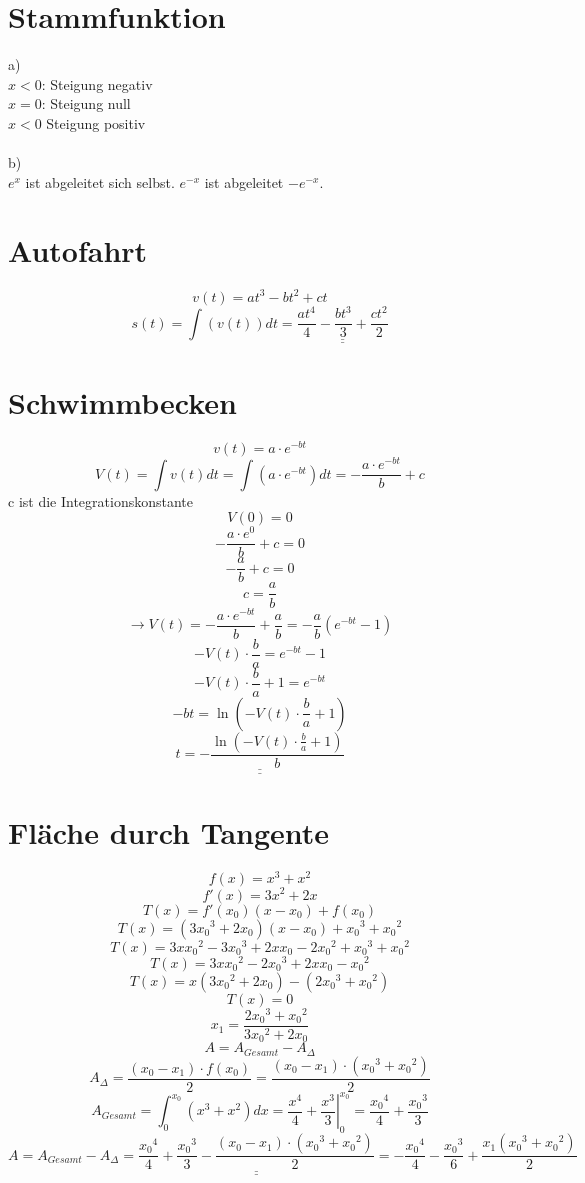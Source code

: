 \section{Stammfunktion}
a)\\
$x<0$: Steigung negativ\\
$x=0$: Steigung null\\
$x<0$ Steigung positiv\\\\
b)\\
$e^x$ ist abgeleitet sich selbst. $e^{-x}$ ist abgeleitet $-e^{-x}$. 

\section{Autofahrt}
\[ v(t) = a t^3 - b t^2 + c t \]
\[ s(t) = \int (v(t)) dt = \underline{\underline{\frac{a t^4}{4} - \frac{b t^3}{3} + \frac{c t^2}{2}}} \]

\section{Schwimmbecken}
\[ v(t) = a \cdot e^{-bt} \]
\[ V(t) = \int v(t) dt = \int \left(a \cdot e^{-bt}\right) dt = -\frac{a \cdot e^{-bt}}{b} + c \]
c ist die Integrationskonstante
\[ V(0) = 0 \]
\[ -\frac{a \cdot e^{0}}{b} + c = 0 \]
\[ -\frac{a}{b} + c = 0 \]
\[ c = \frac{a}{b} \]
\[ \rightarrow V(t) = -\frac{a \cdot e^{-bt}}{b} + \frac{a}{b} = -\frac{a}{b} \left( e^{-bt} - 1 \right) \]
\[ -V(t) \cdot \frac{b}{a} = e^{-bt} - 1 \]
\[ -V(t) \cdot \frac{b}{a} + 1 = e^{-bt} \]
\[ -bt = \ln\left(-V(t) \cdot \frac{b}{a} + 1\right) \]
\[ \underline{\underline{t = -\frac{\ln\left(-V(t) \cdot \frac{b}{a} + 1\right)}{b}}} \]

\section{Fläche durch Tangente}
\[ f(x) = x^3 + x^2 \]
\[ f'(x) = 3 x^2 + 2 x \]
\[ T(x) = f'(x_0)(x - x_0) + f(x_0) \]
\[ T(x) = (3 {x_0}^3 + 2 x_0)(x-x_0) + {x_0}^3 + {x_0}^2 \]
\[ T(x) = 3 x {x_0}^2 - 3 {x_0}^3 + 2 x x_0 - 2 {x_0}^2 + {x_0}^3 + {x_0}^2 \]
\[ T(x) = 3 x {x_0}^2 - 2 {x_0}^3 + 2 x x_0 - {x_0}^2 \]
\[ T(x) = x(3 {x_0}^2 + 2 x_0) - (2 {x_0}^3 + {x_0}^2) \]
\[ T(x) = 0 \]
\[ x_1 = \frac{2 {x_0}^3 + {x_0}^2}{3 {x_0}^2 + 2 x_0} \]
\[ A = A_{Gesamt} - A_\Delta \]
\[ A_\Delta = \frac{(x_0 - x_1) \cdot f(x_0)}{2} = \frac{(x_0 - x_1) \cdot ({x_0}^3 + {x_0}^2)}{2} \]
\[ A_{Gesamt} = \int_0^{x_0} (x^3 + x^2) dx = \left.\frac{x^4}{4} + \frac{x^3}{3} \right|_{0}^{x_0} = \frac{{x_0}^4}{4} + \frac{{x_0}^3}{3} \]
\[ A = A_{Gesamt} - A_\Delta = \underline{\underline{\frac{{x_0}^4}{4} + \frac{{x_0}^3}{3} - \frac{(x_0 - x_1) \cdot ({x_0}^3 + {x_0}^2)}{2}}} = -\frac{{x_0}^4}{4} - \frac{{x_0}^3}{6} + \frac{x_1 ({x_0}^3 + {x_0}^2)}{2} \]

